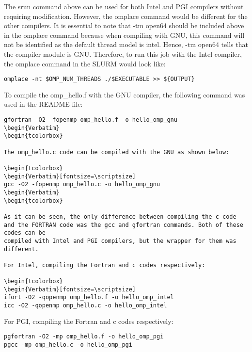 The srun command above can be used for both Intel and PGI compilers without requiring modification. However, the omplace command would be different for
the other compilers. It is essential to note that -tm open64 should be included above in the omplace command because when compiling with GNU, this 
command will not be identified as the default thread model is intel. Hence, -tm open64 tells that the compiler module is GNU. Therefore, to run this job
with the Intel compiler, the omplace command in the SLURM would look like:

\begin{tcolorbox}
\begin{Verbatim}[fontsize=\scriptsize]
omplace -nt $OMP_NUM_THREADS ./$EXECUTABLE >> ${OUTPUT}
\end{Verbatim}
\end{tcolorbox}

To compile the omp\_hello.f with the GNU compiler, the following command was used in the README file:

\begin{tcolorbox}
\begin{Verbatim}[fontsize=\scriptsize]
gfortran -O2 -fopenmp omp_hello.f -o hello_omp_gnu
\begin{Verbatim}
\begin{tcolorbox}

The omp_hello.c code can be compiled with the GNU as shown below:

\begin{tcolorbox}
\begin{Verbatim}[fontsize=\scriptsize]
gcc -O2 -fopenmp omp_hello.c -o hello_omp_gnu
\begin{Verbatim}
\begin{tcolorbox}

As it can be seen, the only difference between compiling the c code and the FORTRAN code was the gcc and gfortran commands. Both of these codes can be 
compiled with Intel and PGI compilers, but the wrapper for them was different.

For Intel, compiling the Fortran and c codes respectively:

\begin{tcolorbox}
\begin{Verbatim}[fontsize=\scriptsize]
ifort -O2 -qopenmp omp_hello.f -o hello_omp_intel
icc -O2 -qopenmp omp_hello.c -o hello_omp_intel
\end{Verbatim}
\end{tcolorbox}

For PGI, compiling the Fortran and c codes respectively:

\begin{tcolorbox}
\begin{Verbatim}[fontsize=\scriptsize]
pgfortran -O2 -mp omp_hello.f -o hello_omp_pgi
pgcc -mp omp_hello.c -o hello_omp_pgi
\end{Verbatim}
\end{tcolorbox}
